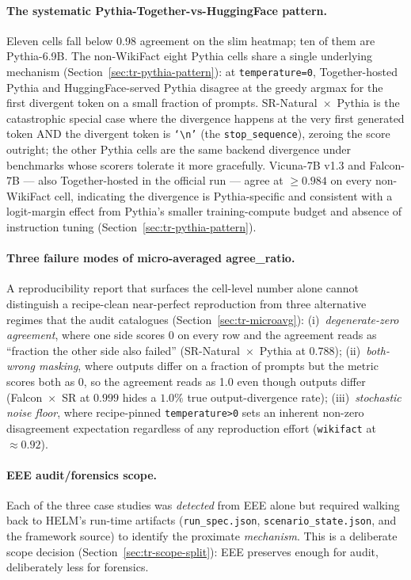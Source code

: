 \documentclass[11pt]{article}
\begin{document}
\paragraph{The systematic Pythia-Together-vs-HuggingFace pattern.}
Eleven cells fall below 0.98 agreement on the slim heatmap; ten of
  them are Pythia-6.9B.
The non-WikiFact eight Pythia cells share a single underlying
  mechanism (Section~\ref{sec:tr-pythia-pattern}): at
  \texttt{temperature=0}, Together-hosted Pythia and HuggingFace-served
  Pythia disagree at the greedy argmax for the first divergent token
  on a small fraction of prompts.
SR-Natural~$\times$~Pythia is the catastrophic special case where the
  divergence happens at the very first generated token AND the
  divergent token is \texttt{`\textbackslash n'} (the
  \texttt{stop\_sequence}), zeroing the score outright; the other
  Pythia cells are the same backend divergence under benchmarks whose
  scorers tolerate it more gracefully.
Vicuna-7B v1.3 and Falcon-7B --- also Together-hosted in the official
  run --- agree at $\geq 0.984$ on every non-WikiFact cell, indicating
  the divergence is Pythia-specific and consistent with a logit-margin
  effect from Pythia's smaller training-compute budget and absence of
  instruction tuning (Section~\ref{sec:tr-pythia-pattern}).

\paragraph{Three failure modes of micro-averaged agree\_ratio.}
A reproducibility report that surfaces the cell-level number alone
  cannot distinguish a recipe-clean near-perfect reproduction from
  three alternative regimes that the audit catalogues
  (Section~\ref{sec:tr-microavg}):
  (i)~\emph{degenerate-zero agreement}, where one side scores 0 on
  every row and the agreement reads as ``fraction the other side also
  failed'' (SR-Natural~$\times$~Pythia at $0.788$);
  (ii)~\emph{both-wrong masking}, where outputs differ on a fraction of
  prompts but the metric scores both as 0, so the agreement reads as
  1.0 even though outputs differ (Falcon~$\times$~SR at $0.999$ hides
  a $1.0\%$ true output-divergence rate);
  (iii)~\emph{stochastic noise floor}, where recipe-pinned
  \texttt{temperature>0} sets an inherent non-zero disagreement
  expectation regardless of any reproduction effort
  (\texttt{wikifact} at $\approx 0.92$).

\paragraph{EEE audit/forensics scope.}
Each of the three case studies was \emph{detected} from EEE alone but
  required walking back to HELM's run-time artifacts
  (\texttt{run\_spec.json}, \texttt{scenario\_state.json}, and the
  framework source) to identify the proximate \emph{mechanism}.
This is a deliberate scope decision (Section~\ref{sec:tr-scope-split}):
  EEE preserves enough for audit, deliberately less for forensics.
\end{document}
